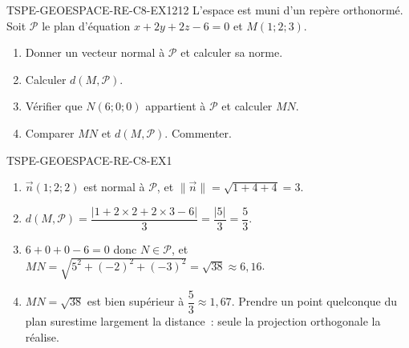 
\begin{exercice}{TSPE-GEOESPACE-RE-C8-EX1}{2}{12}
L'espace est muni d'un repère orthonormé. Soit $\mathcal{P}$ le plan
d'équation $x+2y+2z-6=0$ et $M(1;2;3)$.
\begin{enumerate}
  \item Donner un vecteur normal à $\mathcal{P}$ et calculer sa norme.
  \item Calculer $d(M,\mathcal{P})$.
  \item Vérifier que $N(6;0;0)$ appartient à $\mathcal{P}$ et calculer $MN$.
  \item Comparer $MN$ et $d(M,\mathcal{P})$. Commenter.
\end{enumerate}
\end{exercice}


\begin{corrige}{TSPE-GEOESPACE-RE-C8-EX1}
\begin{enumerate}
  \item $\vec{n}(1;2;2)$ est normal à $\mathcal{P}$, et
        $\lVert\vec{n}\rVert=\sqrt{1+4+4}=3$.
  \item $d(M,\mathcal{P})=\dfrac{\lvert 1+2\times2+2\times3-6\rvert}{3}
        =\dfrac{\lvert 5\rvert}{3}=\dfrac{5}{3}$.
  \item $6+0+0-6=0$ donc $N\in\mathcal{P}$, et
        $MN=\sqrt{5^2+(-2)^2+(-3)^2}=\sqrt{38}\approx 6{,}16$.
  \item $MN=\sqrt{38}$ est bien supérieur à $\dfrac{5}{3}\approx1{,}67$.
        Prendre un point quelconque du plan surestime largement la distance~:
        seule la projection orthogonale la réalise.
\end{enumerate}
\end{corrige}
